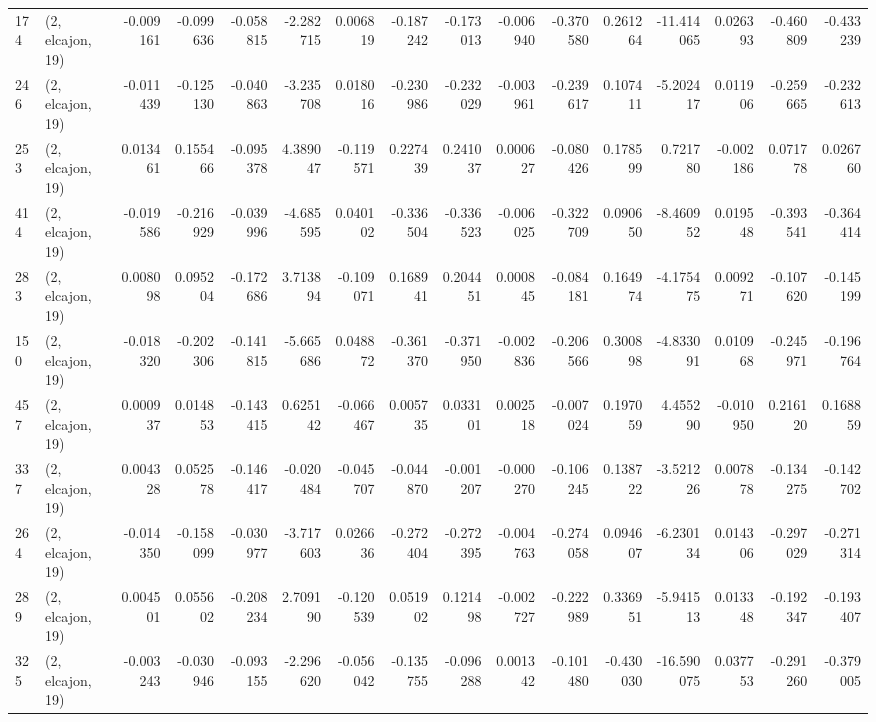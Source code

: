 \begin{tabular}{llrrrrrrrrrrrrrr}
174 &  (2, elcajon, 19) &  -0.009161 & -0.099636 & -0.058815 &   -2.282715 &  0.006819 &  -0.187242 & -0.173013 & -0.006940 & -0.370580 &  0.261264 &  -11.414065 &  0.026393 & -0.460809 & -0.433239 \\
246 &  (2, elcajon, 19) &  -0.011439 & -0.125130 & -0.040863 &   -3.235708 &  0.018016 &  -0.230986 & -0.232029 & -0.003961 & -0.239617 &  0.107411 &   -5.202417 &  0.011906 & -0.259665 & -0.232613 \\
253 &  (2, elcajon, 19) &   0.013461 &  0.155466 & -0.095378 &    4.389047 & -0.119571 &   0.227439 &  0.241037 &  0.000627 & -0.080426 &  0.178599 &    0.721780 & -0.002186 &  0.071778 &  0.026760 \\
414 &  (2, elcajon, 19) &  -0.019586 & -0.216929 & -0.039996 &   -4.685595 &  0.040102 &  -0.336504 & -0.336523 & -0.006025 & -0.322709 &  0.090650 &   -8.460952 &  0.019548 & -0.393541 & -0.364414 \\
283 &  (2, elcajon, 19) &   0.008098 &  0.095204 & -0.172686 &    3.713894 & -0.109071 &   0.168941 &  0.204451 &  0.000845 & -0.084181 &  0.164974 &   -4.175475 &  0.009271 & -0.107620 & -0.145199 \\
150 &  (2, elcajon, 19) &  -0.018320 & -0.202306 & -0.141815 &   -5.665686 &  0.048872 &  -0.361370 & -0.371950 & -0.002836 & -0.206566 &  0.300898 &   -4.833091 &  0.010968 & -0.245971 & -0.196764 \\
457 &  (2, elcajon, 19) &   0.000937 &  0.014853 & -0.143415 &    0.625142 & -0.066467 &   0.005735 &  0.033101 &  0.002518 & -0.007024 &  0.197059 &    4.455290 & -0.010950 &  0.216120 &  0.168859 \\
337 &  (2, elcajon, 19) &   0.004328 &  0.052578 & -0.146417 &   -0.020484 & -0.045707 &  -0.044870 & -0.001207 & -0.000270 & -0.106245 &  0.138722 &   -3.521226 &  0.007878 & -0.134275 & -0.142702 \\
264 &  (2, elcajon, 19) &  -0.014350 & -0.158099 & -0.030977 &   -3.717603 &  0.026636 &  -0.272404 & -0.272395 & -0.004763 & -0.274058 &  0.094607 &   -6.230134 &  0.014306 & -0.297029 & -0.271314 \\
289 &  (2, elcajon, 19) &   0.004501 &  0.055602 & -0.208234 &    2.709190 & -0.120539 &   0.051902 &  0.121498 & -0.002727 & -0.222989 &  0.336951 &   -5.941513 &  0.013348 & -0.192347 & -0.193407 \\
325 &  (2, elcajon, 19) &  -0.003243 & -0.030946 & -0.093155 &   -2.296620 & -0.056042 &  -0.135755 & -0.096288 &  0.001342 & -0.101480 & -0.430030 &  -16.590075 &  0.037753 & -0.291260 & -0.379005 \\

\end{tabular}
